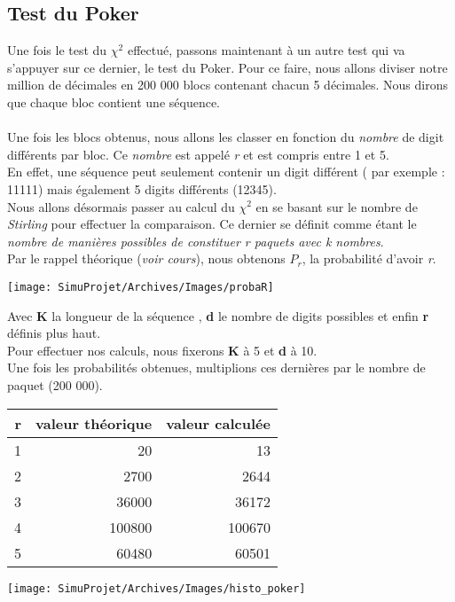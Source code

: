 \documentclass[french]{article}
\begin{document}
\subsection{Test du Poker}
Une fois le test du $\chi^{2}$ effectué, passons maintenant à un autre test qui va s'appuyer sur ce dernier, le test du Poker. Pour ce faire, nous allons diviser notre million de décimales en 200 000 blocs contenant chacun 5 décimales. Nous dirons que chaque bloc contient une séquence.
\\
\\
Une fois les blocs obtenus, nous allons les classer en fonction du \textit{nombre} de digit différents par bloc. Ce \textit{nombre} est appelé \textit{r} et est compris entre 1 et 5.
\\
En effet, une séquence peut seulement contenir un digit différent ( par exemple : 11111) mais également 5 digits différents (12345).
\\
Nous allons désormais passer au calcul du $\chi^{2}$ en se basant sur le nombre de \textit{Stirling} pour
effectuer la comparaison. Ce dernier se définit comme étant le \textit{nombre de manières possibles de constituer r paquets avec k nombres}.
\\
Par le rappel théorique (\textit{voir cours}), nous obtenons $P_{r}$, la probabilité d'avoir \textit{r}.

	\begin{center}
		\texttt{[image: SimuProjet/Archives/Images/probaR]}
	\end{center}

Avec \textbf{K} la longueur de la séquence , \textbf{d} le nombre de digits possibles et enfin \textbf{r}
définis plus haut.
\\
Pour effectuer nos calculs, nous fixerons \textbf{K} à 5 et \textbf{d} à 10.
\\
Une fois les probabilités obtenues, multiplions ces dernières par le nombre de paquet (200 000).

\centering
	\begin{tabular}{|r|r|r|}
		\hline
		r & valeur théorique & valeur calculée\\
		\hline
		1 & 20 & 13\\
		2 & 2700 & 2644\\
		3 & 36000 & 36172\\
		4 & 100800 & 100670\\
		5 & 60480 & 60501\\
		\hline
	\end{tabular}


	\begin{center}
		\texttt{[image: SimuProjet/Archives/Images/histo\_poker]}
	\end{center}
\end{document}
